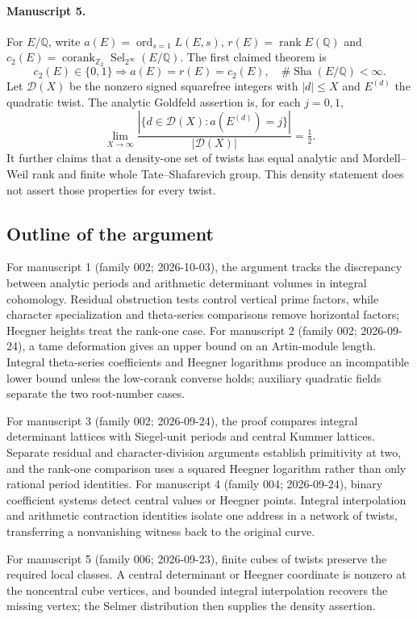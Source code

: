 \documentclass[11pt]{article}
\begin{document}
\paragraph{Manuscript 5.}
For $E/\mathbb Q$, write $a(E)=\operatorname{ord}_{s=1}L(E,s)$, $r(E)=\operatorname{rank}E(\mathbb Q)$ and $c_2(E)=\operatorname{corank}_{\mathbb Z_2}\operatorname{Sel}_{2^{\infty}}(E/\mathbb Q)$. The first claimed theorem is
\[
 c_2(E)\in\{0,1\}\Rightarrow a(E)=r(E)=c_2(E),\quad\#\operatorname{Sha}(E/\mathbb Q)<\infty.
\]
Let $\mathcal D(X)$ be the nonzero signed squarefree integers with $|d|\le X$ and $E^{(d)}$ the quadratic twist. The analytic Goldfeld assertion is, for each $j=0,1$,
\[
 \lim_{X\to\infty}\frac{|\{d\in\mathcal D(X):a(E^{(d)})=j\}|}{|\mathcal D(X)|}=\tfrac12.
\]
It further claims that a density-one set of twists has equal analytic and Mordell--Weil rank and finite whole Tate--Shafarevich group. This density statement does not assert those properties for every twist.

\subsection{Outline of the argument}
For manuscript 1 (family 002; 2026-10-03), the argument tracks the discrepancy between analytic periods and arithmetic determinant volumes in integral cohomology. Residual obstruction tests control vertical prime factors, while character specialization and theta-series comparisons remove horizontal factors; Heegner heights treat the rank-one case. For manuscript 2 (family 002; 2026-09-24), a tame deformation gives an upper bound on an Artin-module length. Integral theta-series coefficients and Heegner logarithms produce an incompatible lower bound unless the low-corank converse holds; auxiliary quadratic fields separate the two root-number cases.

For manuscript 3 (family 002; 2026-09-24), the proof compares integral determinant lattices with Siegel-unit periods and central Kummer lattices. Separate residual and character-division arguments establish primitivity at two, and the rank-one comparison uses a squared Heegner logarithm rather than only rational period identities. For manuscript 4 (family 004; 2026-09-24), binary coefficient systems detect central values or Heegner points. Integral interpolation and arithmetic contraction identities isolate one address in a network of twists, transferring a nonvanishing witness back to the original curve.

For manuscript 5 (family 006; 2026-09-23), finite cubes of twists preserve the required local classes. A central determinant or Heegner coordinate is nonzero at the noncentral cube vertices, and bounded integral interpolation recovers the missing vertex; the Selmer distribution then supplies the density assertion.
\end{document}
